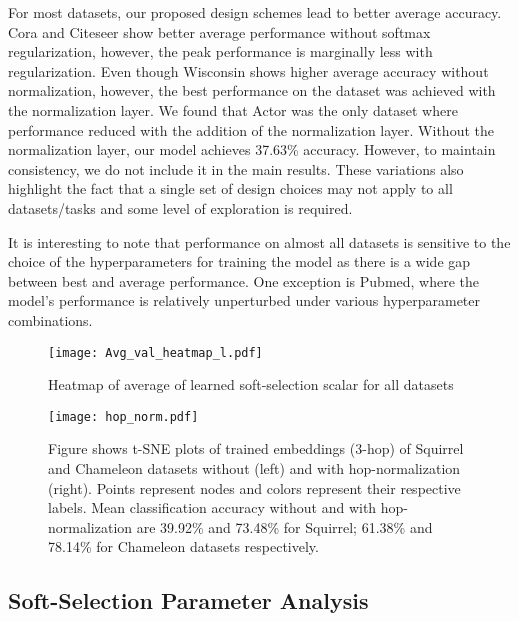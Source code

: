 \documentclass[sigconf,natbib=false]{acmart}
\begin{document}
For most datasets, our proposed design schemes lead to better average accuracy. Cora and Citeseer show better average performance without softmax regularization, however, the peak performance is marginally less with regularization. Even though Wisconsin shows higher average accuracy without normalization, however, the best performance on the dataset was achieved with the normalization layer. We found that Actor was the only dataset where performance reduced with the addition of the normalization layer. Without the normalization layer, our model achieves 37.63\% accuracy. However, to maintain consistency, we do not include it in the main results. These variations also highlight the fact that a single set of design choices may not apply to all datasets/tasks and some level of exploration is required.


It is interesting to note that performance on almost all datasets is sensitive to the choice of the hyperparameters for training the model as there is a wide gap between best and average performance. One exception is Pubmed, where the model's performance is relatively unperturbed under various hyperparameter combinations. 

\begin{figure}[h]
    \centering
    \texttt{[image: Avg\_val\_heatmap\_l.pdf]}
    \caption{Heatmap of average of learned soft-selection scalar for all datasets}
    \label{fig:scalar_val_heat}
\end{figure}








\begin{figure*}
    \centering
    \texttt{[image: hop\_norm.pdf]}
    \caption{Figure shows t-SNE plots of trained embeddings (3-hop) of Squirrel and Chameleon datasets without (left) and with hop-normalization (right). Points represent nodes and colors represent their respective labels. Mean classification accuracy without and with hop-normalization are 39.92\% and 73.48\% for Squirrel; 61.38\% and 78.14\% for Chameleon datasets respectively.    }
    \label{fig:hop_norm}
\end{figure*}


\subsection{Soft-Selection Parameter Analysis}
\end{document}
